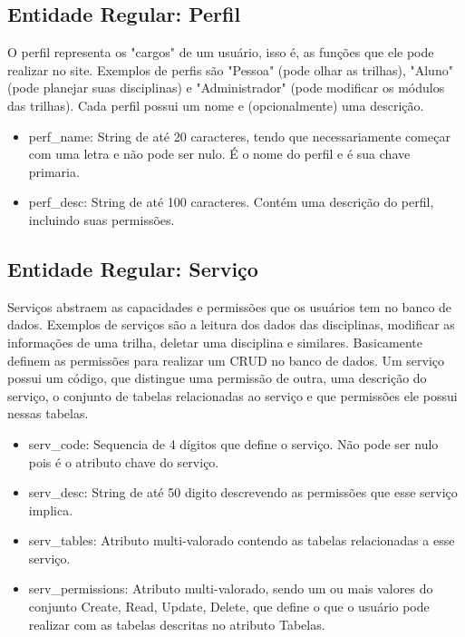 \documentclass{article}
\begin{document}
    \subsection{Entidade Regular: Perfil}
        \quad O perfil representa os "cargos" de um usuário, isso é, as funções que ele pode realizar no site. Exemplos de perfis são "Pessoa" (pode olhar as trilhas), "Aluno" (pode planejar suas disciplinas) e "Administrador" (pode modificar os módulos das trilhas).
        \quad Cada perfil possui um nome e (opcionalmente) uma descrição.
        \begin{itemize}
                \item perf\_name: String de até 20 caracteres, tendo que necessariamente começar com uma letra e não pode ser nulo. É o nome do perfil e é sua chave primaria. 
                \item perf\_desc: String de até 100 caracteres. Contém uma descrição do perfil, incluindo suas permissões.
        \end{itemize}
    
    \subsection{Entidade Regular: Serviço}
        \quad Serviços abstraem as capacidades e permissões que os usuários tem no banco de dados. Exemplos de serviços são a leitura dos dados das disciplinas, modificar as informações de uma trilha, deletar uma disciplina e similares. Basicamente definem as permissões para realizar um CRUD no banco de dados.
        \quad Um serviço possui um código, que distingue uma permissão de outra, uma descrição do serviço, o conjunto de tabelas relacionadas ao serviço e que permissões ele possui nessas tabelas.
        \begin{itemize}
            \item serv\_code: Sequencia de 4 dígitos que define o serviço. Não pode ser nulo pois é o atributo chave do serviço.
            \item serv\_desc: String de até 50 digito descrevendo as permissões que esse serviço implica.
            \item serv\_tables: Atributo multi-valorado contendo as tabelas relacionadas a esse serviço.
            \item serv\_permissions: Atributo multi-valorado, sendo um ou mais valores do conjunto {Create, Read, Update, Delete}, que define o que o usuário pode realizar com as tabelas descritas no atributo Tabelas.
        \end{itemize}
          
\end{document}
